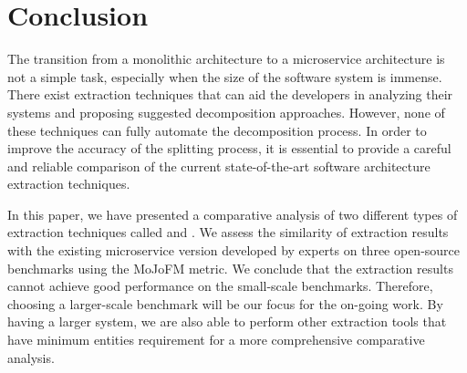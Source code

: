 \section{Conclusion}
\label{sec:conclusion}

The transition from a monolithic architecture to a microservice architecture is not a simple task, especially when the size of the software system is immense. There exist extraction techniques that can aid the developers in analyzing their systems and proposing suggested decomposition approaches. However, none of these techniques can fully automate the decomposition process. In order to improve the accuracy of the splitting process, it is essential to provide a careful and reliable comparison of the current state-of-the-art software architecture extraction techniques. 

In this paper, we have presented a comparative analysis of two different types of extraction techniques called \bn and \fs. We assess the similarity of extraction results with the existing microservice version developed by experts on three open-source benchmarks using the MoJoFM metric. We conclude that the extraction results cannot achieve good performance on the small-scale benchmarks. Therefore, choosing a larger-scale benchmark will be our focus for the on-going work. By having a larger system, we are also able to perform other extraction tools that have minimum entities requirement for a more comprehensive comparative analysis. 



